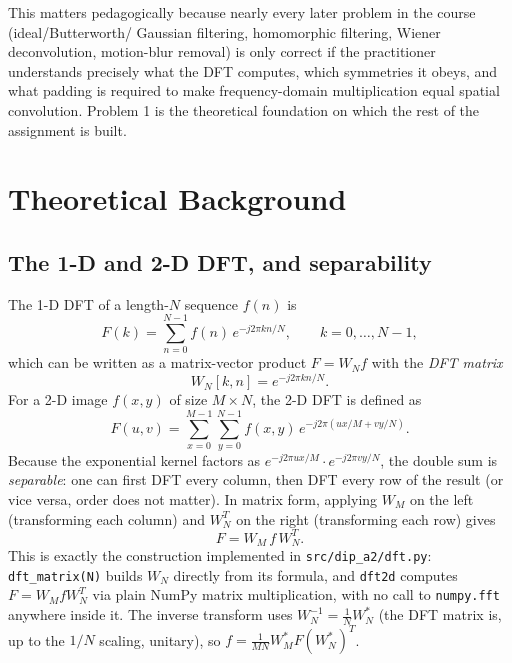 \documentclass[11pt]{article}
\begin{document}
This matters pedagogically because nearly every later problem in the course (ideal/Butterworth/
Gaussian filtering, homomorphic filtering, Wiener deconvolution, motion-blur removal) is only
correct if the practitioner understands precisely what the DFT computes, which symmetries it
obeys, and what padding is required to make frequency-domain multiplication equal spatial
convolution. Problem 1 is the theoretical foundation on which the rest of the assignment is
built.

\section{Theoretical Background}

\subsection{The 1-D and 2-D DFT, and separability}

The 1-D DFT of a length-$N$ sequence $f(n)$ is
\begin{equation}
  F(k) = \sum_{n=0}^{N-1} f(n)\, e^{-j2\pi kn/N}, \qquad k = 0,\dots,N-1,
\end{equation}
which can be written as a matrix-vector product $F = W_N f$ with the \emph{DFT matrix}
\begin{equation}
  W_N[k,n] = e^{-j2\pi kn/N}.
\end{equation}
For a 2-D image $f(x,y)$ of size $M\times N$, the 2-D DFT is defined as
\begin{equation}
  F(u,v) = \sum_{x=0}^{M-1}\sum_{y=0}^{N-1} f(x,y)\, e^{-j2\pi(ux/M + vy/N)}.
\end{equation}
Because the exponential kernel factors as $e^{-j2\pi ux/M}\cdot e^{-j2\pi vy/N}$, the double sum
is \emph{separable}: one can first DFT every column, then DFT every row of the result (or vice
versa, order does not matter). In matrix form, applying $W_M$ on the left (transforming each
column) and $W_N^T$ on the right (transforming each row) gives
\begin{equation}
  F = W_M\, f\, W_N^T.
\end{equation}
This is exactly the construction implemented in \texttt{src/dip\_a2/dft.py}: \texttt{dft\_matrix(N)}
builds $W_N$ directly from its formula, and \texttt{dft2d} computes $F = W_M f W_N^T$ via plain
NumPy matrix multiplication, with no call to \texttt{numpy.fft} anywhere inside it. The inverse
transform uses $W_N^{-1} = \tfrac{1}{N}W_N^{*}$ (the DFT matrix is, up to the $1/N$ scaling,
unitary), so $f = \tfrac{1}{MN} W_M^{*} F (W_N^{*})^T$.
\end{document}
